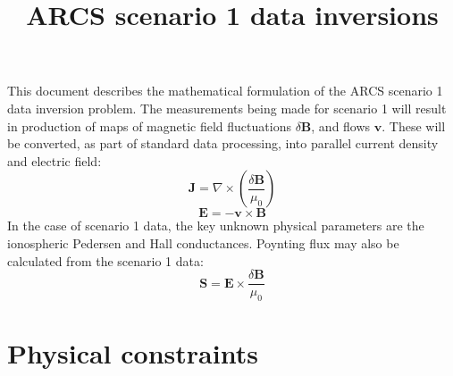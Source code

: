 \documentclass[11pt,letterpaper]{article}
\begin{document}
\setlength{\parindent}{0mm}
\setlength{\parskip}{0.4cm}




\title{ARCS scenario 1 data inversions}

\maketitle

\tableofcontents

\pagebreak


This document describes the mathematical formulation of the ARCS scenario 1 data inversion problem.  The measurements being made for scenario 1 will result in production of maps of magnetic field fluctuations $\delta \mathbf{B}$, and flows $\mathbf{v}$.  These will be converted, as part of standard data processing, into parallel current density and electric field:
\begin{equation}
\mathbf{J} = \nabla \times \left( \frac{\delta \mathbf{B}}{\mu_0} \right)
\end{equation}
\begin{equation}
\mathbf{E} = -\mathbf{v} \times \mathbf{B}
\end{equation}
In the case of scenario 1 data, the key unknown physical parameters are the ionospheric Pedersen and Hall conductances.  Poynting flux may also be calculated from the scenario 1 data:
\begin{equation}
\mathbf{S} = \mathbf{E} \times \frac{\delta \mathbf{B}}{\mu_0}
\end{equation}


\section{Physical constraints}
\end{document}
